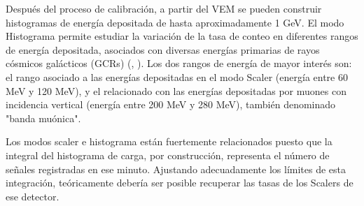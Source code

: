 
Después del proceso de calibración, a partir del VEM se pueden construir histogramas de energía depositada de hasta aproximadamente 1 GeV. El modo Histograma permite estudiar la variación de la tasa de conteo en diferentes rangos de energía depositada, asociados con diversas energías primarias de rayos cósmicos galácticos (GCRs) (\cite{asorey}, \cite{masias_2017}). Los dos rangos de energía de mayor interés son: el rango asociado a las energías depositadas en el modo Scaler (energía entre 60 MeV y 120 MeV), y el relacionado con las energías depositadas por muones con incidencia vertical (energía entre 200 MeV y 280 MeV), también denominado "banda muónica". 

Los modos scaler e histograma están fuertemente relacionados puesto que la integral del histograma de carga, por construcción, representa el número de señales registradas en ese minuto. Ajustando adecuadamente los límites de esta integración, teóricamente debería ser posible recuperar las tasas de los Scalers de ese detector. 
